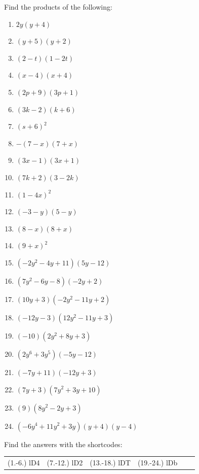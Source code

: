 \begin{exercises}{}
{
Find the products of the following:

\begin{multicols}{2}
\begin{enumerate}[label=\textbf{\arabic*}., itemsep=5pt]
\item $2y(y+4)$ 
\item $(y+5)(y+2) $
\item $(2-t)(1-2t)$
\item $(x-4)(x+4)$
\item $ (2p+9)(3p+1)$
\item $(3k-2)(k+6)$
\item $(s+6)^2$
\item $-(7-x)(7+x)$
\item $(3x-1)(3x+1)$
\item $(7k+2)(3-2k)$
\item $(1-4x)^2$
\item $(-3-y)(5-y)$
\item $(8-x)(8+x)$
\item $(9+x)^2$
\item $(-2{y}^{2}-4y+11)(5y-12)$ 
\item $(7{y}^{2}-6y-8)(-2y+2)$%
\item $(10{y}+3)(-2{y}^{2}-11y+2)$ 
\item $(-12y-3)(12{y}^{2}-11y+3)$%
\item $(-10)(2{y}^{2}+8y+3)$ 
\item $(2{y}^{6}+3{y}^{5})(-5y-12)$%
\item $(-7y+11)(-12y+3)$%
\item $(7y+3)(7{y}^{2}+3y+10)$%
\item $(9)(8{y}^{2}-2y+3)$ 
\item $(-6{y}^{4}+11{y}^{2}+3y)(y+4)(y-4)$ 
\end{enumerate}
\end{multicols}
\practiceinfo 
\par {} Find the answers with the shortcodes:
 \par \begin{tabular}[h]{cccccc}
 (1.-6.) lD4  &  (7.-12.) lD2  &  (13.-18.) lDT & (19.-24.) lDb   \end{tabular}
}
\end{exercises}



